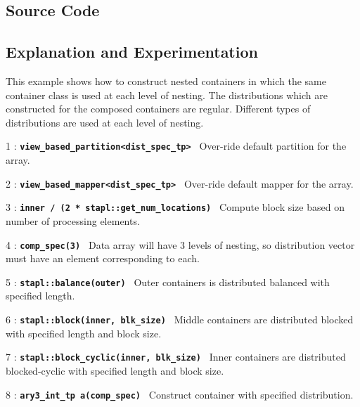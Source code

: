\documentclass{report}
\begin{document}
\subsection{Source Code}



\subsection{Explanation and Experimentation}

This example shows how to construct nested containers in which the same
container class is used at each level of nesting.  The distributions
which are constructed for the composed containers are regular.
Different types of distributions are used at each level of nesting.

\begin{hashitemize}
\item 1 : \texttt{{\bf view\_based\_partition<dist\_spec\_tp> }}
\newline
Over-ride default partition for the array.
\item 2 : \texttt{{\bf view\_based\_mapper<dist\_spec\_tp> }}
\newline
Over-ride default mapper for the array.
\item 3 : \texttt{{\bf inner / (2 * stapl::get\_num\_locations) }}
\newline
Compute block size based on number of processing elements.
\item 4 : \texttt{{\bf comp\_spec(3) }}
\newline
Data array will have 3 levels of nesting, so distribution vector must have an element corresponding to each.
\item 5 : \texttt{{\bf stapl::balance(outer) }}
\newline
Outer containers is distributed balanced with specified length.
\item 6 : \texttt{{\bf stapl::block(inner, blk\_size) }}
\newline
Middle containers are distributed blocked with specified length and block size.
\item 7 : \texttt{{\bf stapl::block\_cyclic(inner, blk\_size) }}
\newline
Inner containers are distributed blocked-cyclic with specified length and  block size.
\item 8 : \texttt{{\bf ary3\_int\_tp a(comp\_spec) }}
\newline
Construct container with specified distribution.
\end{hashitemize}
\end{document}
